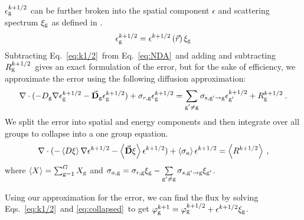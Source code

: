   $\epsilon_{\mathrm{g}}^{k + 1/2}$ can be further broken into the spatial component $\epsilon$ and scattering spectrum $\xi_{\mathrm{g}}$ as defined in \cite{morel-upscat,evans-upscat}.
  \begin{equation}
  \epsilon_{\mathrm{g}}^{k+1/2} = \epsilon^{k+1/2}\left(\vec{r}\right)\xi_{\mathrm{g}}
  \end{equation}
  Subtracting Eq.\ \eqref{eq:k1/2}\ from Eq.\ \eqref{eq:NDA}\ and adding and subtracting $R_{\mathrm{g}}^{k+1/2}$\ gives an exact formulation of the error, but for the sake of efficiency, we approximate the error using the following diffusion approximation:
  \begin{equation}
  \nabla\cdot(-D_{\mathrm{g}}  \nabla \epsilon_{\mathrm{g}}^{k+1/2} - \vec{\bf D}_{\mathrm{g}}
  \epsilon_{\mathrm{g}}^{k+1/2}) + \sigma_{r,\mathrm{g}}  \epsilon_{\mathrm{g}}^{k+1/2} =  \sum\limits_{\substack{{\mathrm{g}'}\neq\mathrm{g}}} \sigma_{\mathrm{s},\mathrm{g}' \to\mathrm{g}}  \epsilon_{\mathrm{g}'}^{k+1/2} + R^{k+1/2}_{\mathrm{g}} \:.
  \end{equation}
  We split the error into spatial and energy components and then integrate over all groups to collapse into a one group equation.
  \begin{equation}
  \nabla\cdot(-\left< D \xi \right> \nabla \epsilon^{k+1/2} - \left<\vec{\bf D} \xi
  \right> \epsilon^{k+1/2}) + \left< \sigma_{a} \right> \epsilon^{k+1/2} = \left< R^{k+1/2} \right> \:,\label{eq:collapsed}
  \end{equation}
  where $\left< X \right> = \sum_{\mathrm{g} = 1}^G X_{\mathrm{g}} $ and $\sigma_{a,\mathrm{g}}  = \sigma_{r,\mathrm{g}}\xi_{\mathrm{g}} - \sum\limits_{{\mathrm{g}'}\neq\mathrm{g}} \sigma_{s,\mathrm{g}'\rightarrow \mathrm{g}} \xi_{\mathrm{g}'}$.
  \par
  Using our approximation for the error, we can find the flux by solving Eqs.\ \eqref{eq:k1/2}\ and \eqref{eq:collapsed}\ to get $\varphi_{\mathrm{g}}^{k+1} = \varphi_{\mathrm{g}}^{k+1/2} + \epsilon^{k+1/2}\xi_{\mathrm{g}}$.